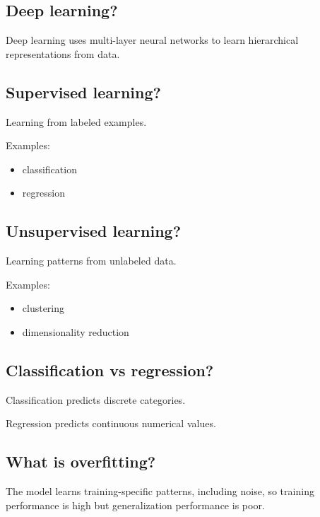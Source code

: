 \medskip

\subsection{Deep learning?}

Deep learning uses multi-layer neural networks to learn hierarchical representations from data.

\medskip

\subsection{Supervised learning?}

Learning from labeled examples.

Examples:

\begin{itemize}
  \item classification
  \item regression
\end{itemize}

\medskip

\subsection{Unsupervised learning?}

Learning patterns from unlabeled data.

Examples:

\begin{itemize}
  \item clustering
  \item dimensionality reduction
\end{itemize}

\medskip

\subsection{Classification vs regression?}

Classification predicts discrete categories.

Regression predicts continuous numerical values.

\medskip

\subsection{What is overfitting?}

The model learns training-specific patterns, including noise, so training performance is high but generalization performance is poor.

